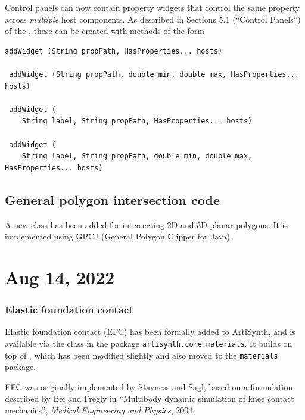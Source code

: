 \documentclass{article}
\begin{document}
Control panels can now contain property widgets that control the same
property across {\it multiple} host components. As described in Sections 5.1
(``Control Panels'') of the , these can be created with methods of the form
%
\begin{lstlisting}[]
 addWidget (String propPath, HasProperties... hosts)

 addWidget (String propPath, double min, double max, HasProperties... hosts)

 addWidget (
    String label, String propPath, HasProperties... hosts)

 addWidget (
    String label, String propPath, double min, double max, HasProperties... hosts)
\end{lstlisting}
%

\subsection*{General polygon intersection code}

A new class  has
been added for intersecting 2D and 3D planar polygons. It is
implemented using GPCJ (General Polygon Clipper for Java).

\section*{Aug 14, 2022}

\subsubsection{Elastic foundation contact}

Elastic foundation contact (EFC) has been formally added to ArtiSynth, and
is available via the class
 in the
package {\tt artisynth.core.materials}. It builds on top of
, which has
been modified slightly and also moved to the {\tt materials} package.

EFC was originally implemented by Stavness and Sagl, based on a
formulation described by Bei and Fregly in ``Multibody dynamic
simulation of knee contact mechanics'', {\it Medical Engineering and
Physics}, 2004.
\end{document}
